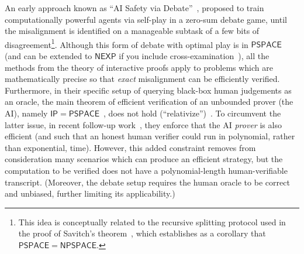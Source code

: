 An early approach known as ``AI Safety via Debate''~\citep{irving2018ai}, proposed to train computationally powerful agents via self-play in a zero-sum debate game, until the misalignment is identified on a manageable subtask of a few bits of disagreement\footnote{This idea is conceptually related to the recursive splitting protocol used in the proof of Savitch's theorem~\citep{savitch1970relationships}, which establishes as a corollary that $\mathsf{PSPACE} = \mathsf{NPSPACE}$.}.
Although this form of debate with optimal play is in $\mathsf{PSPACE}$ (and can be extended to $\mathsf{NEXP}$ if you include cross-examination~\citep{barnes2020progress}), all the methods from the theory of interactive proofs apply to problems which are mathematically precise so that \emph{exact} misalignment can be efficiently verified.
Furthermore, in their specific setup of querying black-box human judgements as an oracle, the main theorem of efficient verification of an unbounded prover (the AI), namely $\mathsf{IP}=\mathsf{PSPACE}$~\citep{shamir1992ip,lund1992algebraic}, does not hold (``relativize'')~\citep{fortnow1994role,fortnow1988there}.
To circumvent the latter issue, in recent follow-up work~\citep{brown2023scalable}, they enforce that the AI \emph{prover} is also efficient (and such that an honest human verifier could run in polynomial, rather than exponential, time).
However, this added constraint removes from consideration many scenarios which can produce an efficient strategy, but the computation to be verified does not have a polynomial-length human-verifiable transcript. 
(Moreover, the debate setup requires the human oracle to be correct and unbiased, further limiting its applicability.)

